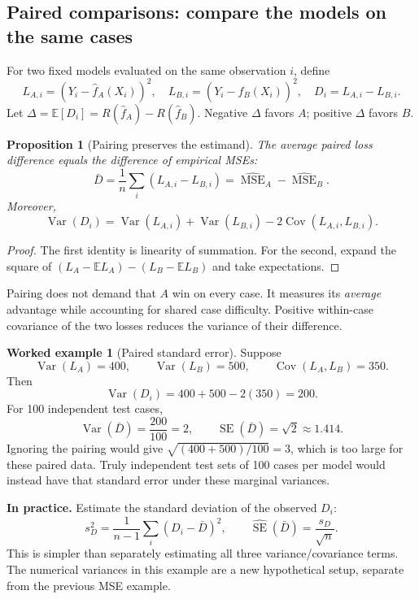 \documentclass[11pt,letterpaper]{article}
\newcommand{\E}{\mathbb E}
\newcommand{\Var}{\operatorname{Var}}
\newcommand{\Cov}{\operatorname{Cov}}
\newcommand{\SE}{\operatorname{SE}}
\newcommand{\MSE}{\operatorname{MSE}}
\newtheorem{proposition}[theorem]{Proposition}
\theoremstyle{definition}
\newtheorem{example}[theorem]{Worked example}
\theoremstyle{remark}
\numberwithin{equation}{section}
\begin{document}
\subsection{Paired comparisons: compare the models on the same cases}
For two fixed models evaluated on the same observation $i$, define
\[
L_{A,i}=(Y_i-\hat f_A(X_i))^2,\quad
L_{B,i}=(Y_i-\hat f_B(X_i))^2,\quad D_i=L_{A,i}-L_{B,i}.
\]
Let $\Delta=\E[D_i]=R(\hat f_A)-R(\hat f_B)$.
Negative $\Delta$ favors $A$; positive $\Delta$ favors $B$.
\begin{proposition}[Pairing preserves the estimand]
The average paired loss difference equals the difference of empirical MSEs:
\[
\bar D=\frac1n\sum_i(L_{A,i}-L_{B,i})
=\widehat{\MSE}_A-\widehat{\MSE}_B.
\]
Moreover,
\begin{equation}
\Var(D_i)=\Var(L_{A,i})+\Var(L_{B,i})-2\Cov(L_{A,i},L_{B,i}).
\end{equation}
\end{proposition}
\begin{proof}
The first identity is linearity of summation. For the second, expand the square
of $(L_A-\E L_A)-(L_B-\E L_B)$ and take expectations.
\end{proof}
Pairing does not demand that $A$ win on every case. It measures its \emph{average}
advantage while accounting for shared case difficulty. Positive within-case
covariance of the two losses reduces the variance of their difference.

\begin{example}[Paired standard error]
Suppose
\[
\Var(L_A)=400,\qquad\Var(L_B)=500,\qquad\Cov(L_A,L_B)=350.
\]
Then
\[
\Var(D_i)=400+500-2(350)=200.
\]
For 100 independent test cases,
\[
\Var(\bar D)=\frac{200}{100}=2,\qquad
\SE(\bar D)=\sqrt2\approx1.414.
\]
Ignoring the pairing would give $\sqrt{(400+500)/100}=3$, which is too large
for these paired data. Truly independent test sets of 100 cases per model
would instead have that standard error under these marginal variances.
\end{example}
\textbf{In practice.} Estimate the standard deviation of the observed $D_i$:
\[
s_D^2=\frac1{n-1}\sum_i(D_i-\bar D)^2,\qquad
\widehat{\SE}(\bar D)=\frac{s_D}{\sqrt n}.
\]
This is simpler than separately estimating all three variance/covariance terms.
The numerical variances in this example are a new hypothetical setup, separate
from the previous MSE example.
\newpage
\end{document}
